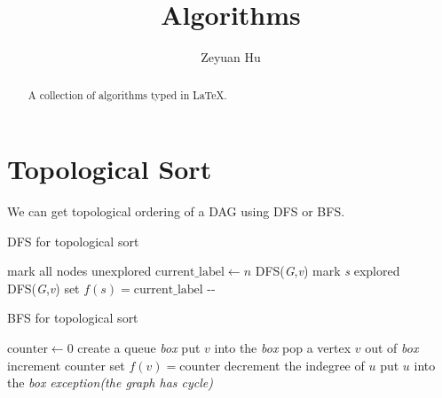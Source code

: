 \documentclass[]{article}
\title{Algorithms}
\author{Zeyuan Hu}
\begin{document}
\maketitle

\begin{abstract}
A collection of algorithms typed in \LaTeX.
\end{abstract}

\tableofcontents
\pagebreak

\section{Topological Sort}

We can get topological ordering of a DAG using DFS or BFS.

\begin{algorithm}
\caption{DFS for topological sort}\label{dfs-topological}
\begin{algorithmic}[1]
\State mark all nodes unexplored
\State $\text{current\_label} \gets n$ 
 
\State DFS(\textit{G},\textit{v})
\EndIf
\EndFor
\EndProcedure
\State
{}
\State mark \textit{s} explored
\State DFS(\textit{G},\textit{v})
\EndIf
\EndFor
\State set $f(s) = \text{current\_label}$ %
\State {}-{}-
\EndProcedure
\end{algorithmic}
\end{algorithm}

\begin{algorithm}
\caption{BFS for topological sort}\label{bfs-topological}
\begin{algorithmic}[1]
\State $\text{counter} \gets 0$
\State create a queue \textit{box}
\State put $v$ into the \textit{box}
\EndIf
\EndFor
{}
\State pop a vertex $v$ out of \textit{box}
\State increment $\text{counter}$
\State set $f(v) = \text{counter}$
\State decrement the indegree of $u$
\State put $u$ into the \textit{box}
\EndIf
\EndFor
\EndWhile
{}
\State \textit{exception(the graph has cycle)}
\EndIf
\EndProcedure
\end{algorithmic}
\end{algorithm}
\end{document}
